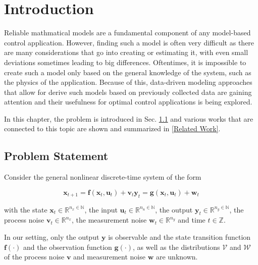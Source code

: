 \chapter{Introduction}
\label{sec:introduction}

Reliable mathmatical models are a fundamental component of any model-based control application. However, finding such a model is often very difficult as there are many considerations that go into creating or estimating it, with even small deviations sometimes leading to big differences. Oftentimes, it is impossible to create such a model only based on the general knowledge of the system, such as the physics of the application. Because of this, data-driven modeling approaches that allow for derive such models based on previously collected data are gaining attention and their usefulness for optimal control applications is being explored.

In this chapter, the problem is introduced in Sec. \ref{Problem Statement} and various works that are connected to this topic are shown and summarized in \ref{Related Work}.

\section{Problem Statement} \label{Problem Statement}

Consider the general nonlinear discrete-time system of the form

\begin{subequations} \label{System equation}
\begin{equation}
\boldsymbol{x}_{t+1} = \boldsymbol{f} \left( \boldsymbol{x}_{t}, \boldsymbol{u}_t \right) + \boldsymbol{v}_{t}
\end{equation}
\begin{equation}
\boldsymbol{y}_{t} = \boldsymbol{g} \left( \boldsymbol{x}_{t}, \boldsymbol{u}_t \right) + \boldsymbol{w}_{t}
\end{equation}
\end{subequations}

with the state $\boldsymbol{x}_t \in \mathbb{R}^{n_x \in \mathbb{N}}$, the input $\boldsymbol{u}_t \in \mathbb{R}^{n_u \in \mathbb{N}}$, the output $\boldsymbol{y}_t \in \mathbb{R}^{n_y \in \mathbb{N}}$, the process noise $\boldsymbol{v}_{t} \in \mathbb{R}^{n_x}$, the measurement noise $\boldsymbol{w}_{t} \in \mathbb{R}^{n_y}$ and time $t \in \mathbb{Z}$. 

In our setting, only the output $\boldsymbol{y}$ is observable and the state transition function $\boldsymbol{f}(\cdot)$ and the observation function $\boldsymbol{g}(\cdot)$, as well as the distributions $\boldsymbol{\mathcal{V}}$ and $\boldsymbol{\mathcal{W}}$ of the process noise $\boldsymbol{v}$ and measurement noise $\boldsymbol{w}$ are unknown.

